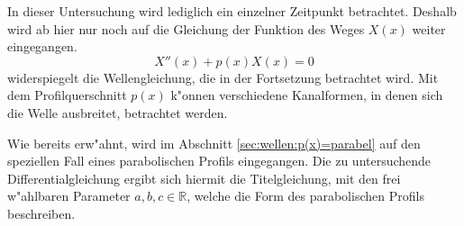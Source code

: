 In dieser Untersuchung wird lediglich ein einzelner Zeitpunkt betrachtet.
Deshalb wird ab hier nur noch auf die Gleichung der Funktion des Weges $X(x)$
weiter eingegangen.
\begin{equation*}
	X''(x) + p(x) X(x) = 0
\end{equation*}
widerspiegelt die Wellengleichung, die in der Fortsetzung betrachtet wird. Mit 
dem Profilquerschnitt $p(x)$ k"onnen verschiedene Kanalformen, in denen 
sich die Welle ausbreitet, betrachtet werden.

Wie bereits erw"ahnt, wird im Abschnitt \ref{sec:wellen:p(x)=parabel} auf den 
speziellen Fall eines parabolischen Profils eingegangen. Die zu untersuchende 
Differentialgleichung ergibt sich hiermit die Titelgleichung, mit den frei 
w"ahlbaren Parameter ${a,b,c} \in \mathbb{R}$, welche die Form des 
parabolischen Profils beschreiben.

